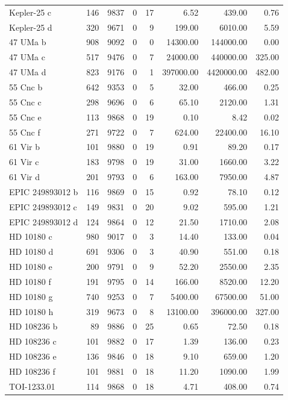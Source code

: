 \begin{table}
\begin{tabular}{lrrrrrrr}
Kepler-25 c & 146 & 9837 & 0 & 17 & 6.52 & 439.00 & 0.76 \\
Kepler-25 d & 320 & 9671 & 0 & 9 & 199.00 & 6010.00 & 5.59 \\
47 UMa b & 908 & 9092 & 0 & 0 & 14300.00 & 144000.00 & 0.00 \\
47 UMa c & 517 & 9476 & 0 & 7 & 24000.00 & 440000.00 & 325.00 \\
47 UMa d & 823 & 9176 & 0 & 1 & 397000.00 & 4420000.00 & 482.00 \\
55 Cnc b & 642 & 9353 & 0 & 5 & 32.00 & 466.00 & 0.25 \\
55 Cnc c & 298 & 9696 & 0 & 6 & 65.10 & 2120.00 & 1.31 \\
55 Cnc e & 113 & 9868 & 0 & 19 & 0.10 & 8.42 & 0.02 \\
55 Cnc f & 271 & 9722 & 0 & 7 & 624.00 & 22400.00 & 16.10 \\
61 Vir b & 101 & 9880 & 0 & 19 & 0.91 & 89.20 & 0.17 \\
61 Vir c & 183 & 9798 & 0 & 19 & 31.00 & 1660.00 & 3.22 \\
61 Vir d & 201 & 9793 & 0 & 6 & 163.00 & 7950.00 & 4.87 \\
EPIC 249893012 b & 116 & 9869 & 0 & 15 & 0.92 & 78.10 & 0.12 \\
EPIC 249893012 c & 149 & 9831 & 0 & 20 & 9.02 & 595.00 & 1.21 \\
EPIC 249893012 d & 124 & 9864 & 0 & 12 & 21.50 & 1710.00 & 2.08 \\
HD 10180 c & 980 & 9017 & 0 & 3 & 14.40 & 133.00 & 0.04 \\
HD 10180 d & 691 & 9306 & 0 & 3 & 40.90 & 551.00 & 0.18 \\
HD 10180 e & 200 & 9791 & 0 & 9 & 52.20 & 2550.00 & 2.35 \\
HD 10180 f & 191 & 9795 & 0 & 14 & 166.00 & 8520.00 & 12.20 \\
HD 10180 g & 740 & 9253 & 0 & 7 & 5400.00 & 67500.00 & 51.00 \\
HD 10180 h & 319 & 9673 & 0 & 8 & 13100.00 & 396000.00 & 327.00 \\
HD 108236 b & 89 & 9886 & 0 & 25 & 0.65 & 72.50 & 0.18 \\
HD 108236 c & 101 & 9882 & 0 & 17 & 1.39 & 136.00 & 0.23 \\
HD 108236 e & 136 & 9846 & 0 & 18 & 9.10 & 659.00 & 1.20 \\
HD 108236 f & 101 & 9881 & 0 & 18 & 11.20 & 1090.00 & 1.99 \\
TOI-1233.01 & 114 & 9868 & 0 & 18 & 4.71 & 408.00 & 0.74 \\

\end{tabular}
\end{table}
